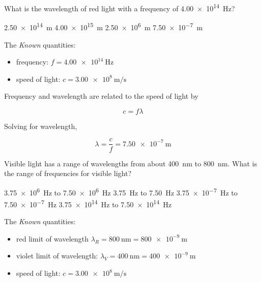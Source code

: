 \documentclass{exam}
\begin{document}
\begin{questions}
\question %
What is the wavelength of red light with a frequency of \SI{4.00e14}{\Hz}?

\begin{choices}
\choice \SI{2.50e14}{\meter}
\choice \SI{4.00e15}{\meter}
\choice \SI{2.50e6}{\meter}
\CorrectChoice \SI{7.50e-7}{\meter}
\end{choices}

\begin{solution}
The \textit{Known} quantities:

\begin{itemize}
    \item frequency: $f = \SI{4.00e14}{\Hz}$
    \item speed of light: $c = \SI[per-mode=symbol]{3.00e8}{\meter\per\second}$
\end{itemize}

Frequency and wavelength are related to the speed of light by

\begin{equation*}
    c = f \lambda
\end{equation*}

Solving for wavelength,

\begin{equation*}
    \lambda = \frac{c}{f} = \SI{7.50e-7}{\meter}
\end{equation*}
\end{solution}

\question %
Visible light has a range of wavelengths from about \SI{400}{nm} to \SI{800}{nm}. What is the range of frequencies for visible light?

\begin{choices}
\choice \SI{3.75e6}{\Hz} to \SI{7.50e6}{\Hz}
\choice \SI{3.75}{\Hz} to \SI{7.50}{\Hz}
\choice \SI{3.75e-7}{\Hz} to \SI{7.50e-7}{\Hz}
\CorrectChoice \SI{3.75e14}{\Hz} to \SI{7.50e14}{\Hz}
\end{choices}

\begin{solution}
The \textit{Known} quantities:

\begin{itemize}
    \item red limit of wavelength $\lambda_R = \SI{800}{\nano\meter} = \SI{800e-9}{\meter}$
    \item violet limit of wavelength: $\lambda_V = \SI{400}{\nano\meter} = \SI{400e-9}{\meter}$
    \item speed of light: $c = \SI{3.00e8}{\meter/\second}$
\end{itemize}


\end{solution}
\end{questions}
\end{document}
